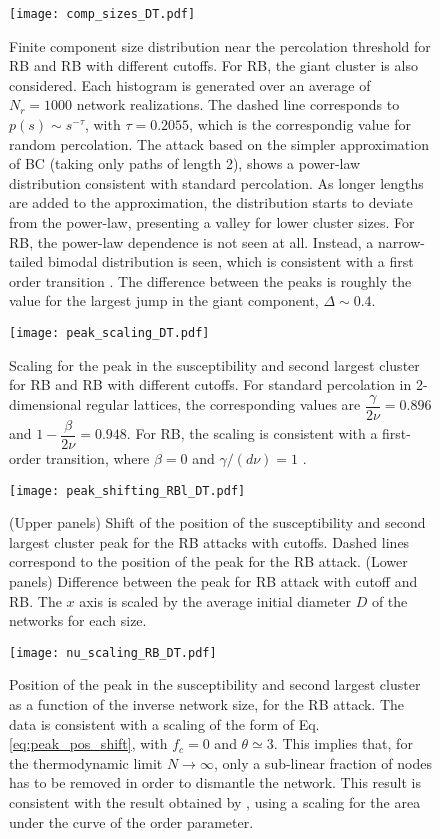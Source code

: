 \documentclass{article}
\begin{document}
\begin{figure}
\centering
\texttt{[image: comp\_sizes\_DT.pdf]}
\caption{Finite component size distribution near the percolation threshold for RB and RB with different cutoffs. For RB, the giant cluster is also considered. Each histogram is generated over an average of $N_r = 1000$ network realizations. The dashed line corresponds to $p(s) \sim s^{-\tau}$, with $\tau = 0.2055$, which is the correspondig value for random percolation. The attack based on the simpler approximation of BC (taking only paths of length 2), shows a power-law distribution consistent with standard percolation. As longer lengths are added to the approximation, the distribution starts to deviate from the power-law, presenting a valley for lower cluster sizes. For RB, the power-law dependence is not seen at all. Instead, a narrow-tailed bimodal distribution is seen, which is consistent with a first order transition \cite{Araujo2010,Binder1992} . The difference between the peaks is roughly the value for the largest jump in the giant component, $\Delta\sim 0.4$. }
\end{figure}

\begin{figure}
\centering
\texttt{[image: peak\_scaling\_DT.pdf]}
\caption{Scaling for the peak in the susceptibility and second largest cluster for RB and RB with different cutoffs. For standard percolation in 2-dimensional regular lattices, the corresponding values are $\dfrac{\gamma}{2\nu} = 0.896$ and $1-\dfrac{\beta}{2\nu} = 0.948$. For RB, the scaling is consistent with a first-order transition, where $\beta = 0$ and $\gamma/(d\nu) = 1$ \cite{Binder1981,Binder1984,Cho2009}. }
\end{figure}

\begin{figure}
\centering
\texttt{[image: peak\_shifting\_RBl\_DT.pdf]}
\caption{(Upper panels) Shift of the position of the susceptibility and second largest cluster peak for the RB attacks with cutoffs. Dashed lines correspond to the position of the peak for the RB attack. (Lower panels) Difference between the peak for RB attack with cutoff and RB. The $x$ axis is scaled by the average initial diameter $D$ of the networks for each size.}
\end{figure}

\begin{figure}
\centering
\texttt{[image: nu\_scaling\_RB\_DT.pdf]}
\caption{Position of the peak in the susceptibility and second largest cluster as a function of the inverse network size, for the RB attack. The data is consistent with a scaling of the form of Eq. \ref{eq:peak_pos_shift}, with $f_c = 0$ and $\theta \simeq 3$. This implies that, for the thermodynamic limit $N\rightarrow \infty$, only a sub-linear fraction of nodes has to be removed in order to dismantle the network. This result is consistent with the result obtained by \cite{Norrenbrock2016FragmentationAttacks}, using a scaling for the area under the curve of the order parameter.}
\end{figure}
\end{document}
